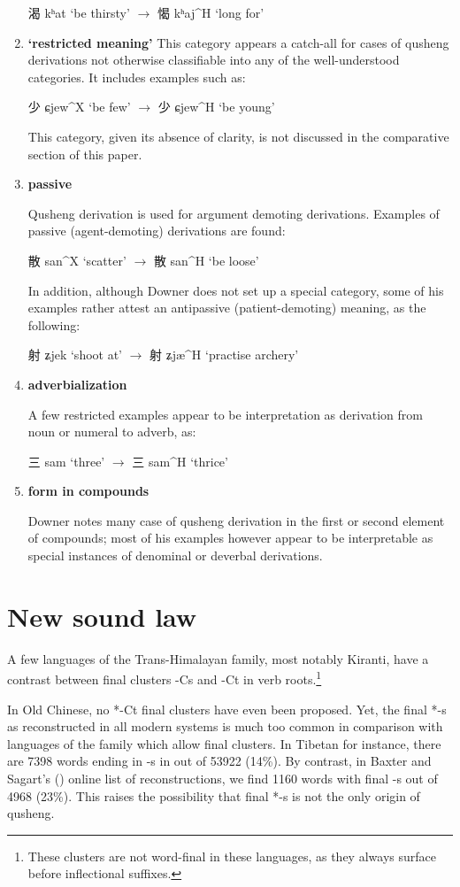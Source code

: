 \documentclass[oldfontcommands,oneside,a4paper,11pt]{article}
\newcommand{\ipa}[1]{{\phon \mbox{#1}}} %
\newcommand{\zh}[1]{{\cn #1}}
\newcommand{\ch}[3]{\zh{#1} \ipa{#2} `#3'}
\begin{document}
\begin{enumerate}
\ch{渴}{kʰat}{be thirsty} $\rightarrow$ \ch{愒}{kʰaj^H}{long for} 

\item \textbf{`restricted meaning'}
This category appears a catch-all for cases of qusheng derivations not otherwise classifiable into any of the well-understood categories. It includes examples such as:

\ch{少}{ɕjew^X}{be few} $\rightarrow$ \ch{少}{ɕjew^H}{be young} 

This category, given its absence of clarity, is not discussed in the comparative section of this paper.

\item \textbf{passive}

Qusheng derivation is used for argument demoting derivations. Examples of passive (agent-demoting) derivations are found:

\ch{散}{san^X}{scatter} $\rightarrow$ \ch{散}{san^H}{be loose} 

In addition, although Downer does not set up a special category, some of his examples rather attest an antipassive (patient-demoting) meaning, as the following:

\ch{射}{ʑjek}{shoot at} $\rightarrow$ \ch{射}{ʑjæ^H}{practise archery} 

\item \textbf{adverbialization}

A few restricted examples appear to be interpretation as derivation from noun or numeral to adverb, as:

\ch{三}{sam}{three} $\rightarrow$ \ch{三}{sam^H}{thrice} 

\item \textbf{form in compounds}

Downer notes many case of qusheng derivation in the first or second element of compounds; most of his examples however appear to be interpretable as special instances of denominal or deverbal derivations.
\end{enumerate}

\section{New sound law}
A few languages of the Trans-Himalayan family, most notably Kiranti, have a contrast between final clusters -Cs and -Ct in verb roots.\footnote{These clusters are not word-final in these languages, as they always surface before inflectional suffixes.} 

In Old Chinese, no *-Ct final clusters have even been proposed. Yet, the final *-s as reconstructed in all modern systems is much too common in comparison with languages of the family which allow final clusters. In Tibetan for instance, there are 7398 words ending in -s in  \citet{bodrgya} out of 53922 (14\%). By contrast, in Baxter and Sagart's (\citeyear{bs14oc}) online list of reconstructions, we find 1160 words with final -s out of 4968 (23\%). This raises the possibility that final *-s is not the only origin of qusheng.
\end{document}

